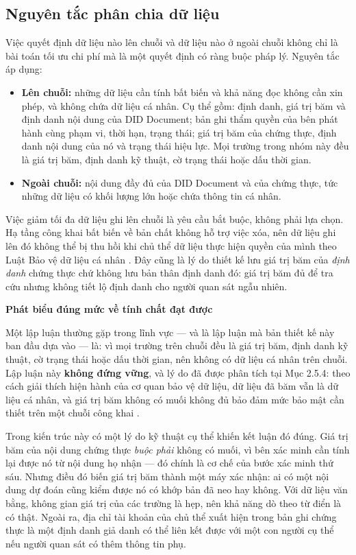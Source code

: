 \subsection{Nguyên tắc phân chia dữ liệu}

Việc quyết định dữ liệu nào lên chuỗi và dữ liệu nào ở ngoài chuỗi không chỉ là bài toán tối ưu chi phí mà là một quyết định có ràng buộc pháp lý. Nguyên tắc áp dụng:

\begin{itemize}
    \item \textbf{Lên chuỗi:} những dữ liệu cần tính bất biến và khả năng đọc không cần xin phép, và không chứa dữ liệu cá nhân. Cụ thể gồm: định danh, giá trị băm và định danh nội dung của DID Document; bản ghi thẩm quyền của bên phát hành cùng phạm vi, thời hạn, trạng thái; giá trị băm của chứng thực, định danh nội dung của nó và trạng thái hiệu lực. Mọi trường trong nhóm này đều là giá trị băm, định danh kỹ thuật, cờ trạng thái hoặc dấu thời gian.
    \item \textbf{Ngoài chuỗi:} nội dung đầy đủ của DID Document và của chứng thực, tức những dữ liệu có khối lượng lớn hoặc chứa thông tin cá nhân.
\end{itemize}

Việc giảm tối đa dữ liệu ghi lên chuỗi là yêu cầu bắt buộc, không phải lựa chọn. Hạ tầng công khai bất biến về bản chất không hỗ trợ việc xóa, nên dữ liệu ghi lên đó không thể bị thu hồi khi chủ thể dữ liệu thực hiện quyền của mình theo Luật Bảo vệ dữ liệu cá nhân \cite{LuatBVDLCN2025}. Đây cũng là lý do thiết kế lưu giá trị băm của \emph{định danh} chứng thực chứ không lưu bản thân định danh đó: giá trị băm đủ để tra cứu nhưng không tiết lộ định danh cho người quan sát ngẫu nhiên.

\noindent \textbf{Phát biểu đúng mức về tính chất đạt được}

Một lập luận thường gặp trong lĩnh vực --- và là lập luận mà bản thiết kế này ban đầu dựa vào --- là: vì mọi trường trên chuỗi đều là giá trị băm, định danh kỹ thuật, cờ trạng thái hoặc dấu thời gian, nên không có dữ liệu cá nhân trên chuỗi. Lập luận này \textbf{không đứng vững}, và lý do đã được phân tích tại Mục 2.5.4: theo cách giải thích hiện hành của cơ quan bảo vệ dữ liệu, dữ liệu đã băm vẫn là dữ liệu cá nhân, và giá trị băm không có muối không đủ bảo đảm mức bảo mật cần thiết trên một chuỗi công khai \cite{EDPB2025}.

Trong kiến trúc này có một lý do kỹ thuật cụ thể khiến kết luận đó đúng. Giá trị băm của nội dung chứng thực \emph{buộc phải} không có muối, vì bên xác minh cần tính lại được nó từ nội dung họ nhận --- đó chính là cơ chế của bước xác minh thứ sáu. Nhưng điều đó biến giá trị băm thành một máy xác nhận: ai có một nội dung dự đoán cũng kiểm được nó có khớp bản đã neo hay không. Với dữ liệu văn bằng, không gian giá trị của các trường là hẹp, nên khả năng dò theo từ điển là có thật. Ngoài ra, địa chỉ tài khoản của chủ thể xuất hiện trong bản ghi chứng thực là một định danh giả danh có thể liên kết được với một con người cụ thể nếu người quan sát có thêm thông tin phụ.

